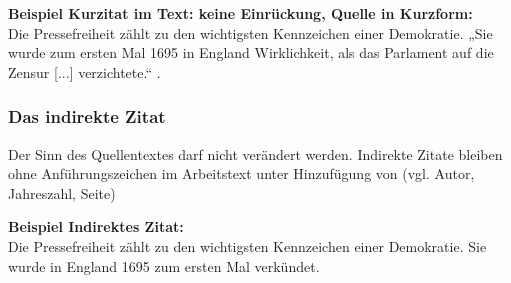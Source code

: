 \documentclass[a4paper, 12pt, xcolor=dvipsnames]{scrartcl}		%
\begin{document}
\textbf{Beispiel Kurzitat im Text: keine Einrückung, Quelle in Kurzform:}\\
Die Pressefreiheit zählt zu den wichtigsten Kennzeichen einer Demokratie. „Sie wurde zum ersten Mal
1695 in England Wirklichkeit, als das Parlament auf die Zensur [...] verzichtete.“ \cite{Skript:ES1}.

\subsubsection{Das indirekte Zitat}
\begin{Merksatz}
Der Sinn des Quellentextes darf nicht verändert werden. Indirekte Zitate bleiben ohne Anführungszeichen im Arbeitstext unter Hinzufügung von (vgl. Autor, Jahreszahl, Seite)
\end{Merksatz}
%
\textbf{Beispiel Indirektes Zitat:}\\
Die Pressefreiheit zählt zu den wichtigsten Kennzeichen einer Demokratie. Sie wurde in England
1695 zum ersten Mal verkündet. \cite{Buch:Deimel1}
\newpage

%
% 
%
%
%
\end{document}
